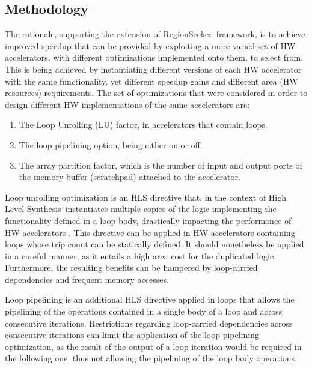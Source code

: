 \documentclass[]{usiinfthesis}
\newcommand{\rseeker}{{RegionSeeker}}
\newcommand{\HLS}{{High Level Synthesis}}
\begin{document}

\subsection{Methodology}
\label{subsec:mv_meth}

The rationale, supporting the extension of \rseeker\ framework, is to achieve improved
speedup that can be provided by exploiting a more varied set of HW accelerators, with different 
optimizations implemented onto them, to select from. This is being achieved by instantiating 
different versions of each HW accelerator with the same functionality, yet different speedup gains 
and different area (HW resources) requirements. The set of optimizations that were considered in 
order to design different HW implementations of the same accelerators are: 
\begin{enumerate}
\item The Loop Unrolling 
(LU) factor, in accelerators that contain loops.
\item The loop pipelining option, being either on or off.
\item The array partition factor, 
which is the number of input and output ports of the memory buffer (scratchpad) attached 
to the accelerator.
\end{enumerate}\par

Loop unrolling optimization is an HLS directive that, in the context of \HLS\, instantiates multiple 
copies of the logic implementing the functionality defined in a loop body, drastically impacting the 
performance of HW accelerators \cite{KurraApr07} \cite{KulkarniOct12}. This directive can be applied in HW
accelerators containing loops whose trip count can be statically defined. It should nonetheless
be applied in a careful manner, as it entails a high area cost for the duplicated logic. Furthermore,
the resulting benefits can be hampered by loop-carried dependencies and frequent memory
accesses.\par
Loop pipelining is an additional HLS directive applied in loops that allows the pipelining of 
the operations contained in a single body of a loop and across consecutive iterations. Restrictions 
regarding loop-carried dependencies across consecutive iterations can limit the application of the loop
pipelining optimization, as the result of the output of a loop iteration would be required in the following
one, thus not allowing the pipelining of the loop body operations.\par
\end{document}
